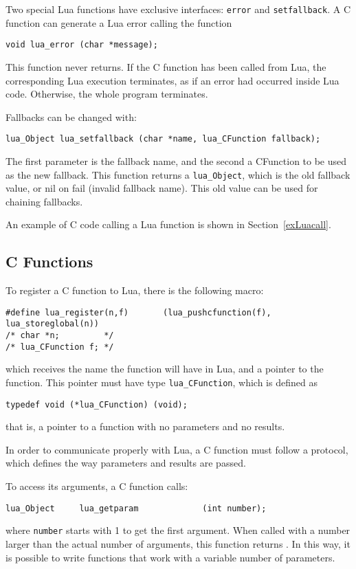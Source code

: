 Two special Lua functions have exclusive interfaces:
\verb'error' and \verb'setfallback'.
A C function can generate a Lua error calling the function
\begin{verbatim}
void lua_error (char *message);
\end{verbatim}
This function never returns.
If the C function has been called from Lua,
the corresponding Lua execution terminates,
as if an error had occurred inside Lua code.
Otherwise, the whole program terminates.

Fallbacks can be changed with:
\begin{verbatim}
lua_Object lua_setfallback (char *name, lua_CFunction fallback);
\end{verbatim}
The first parameter is the fallback name,
and the second a CFunction to be used as the new fallback.
This function returns a \verb'lua_Object',
which is the old fallback value,
or nil on fail (invalid fallback name).
This old value can be used for chaining fallbacks.

An example of C code calling a Lua function is shown in
Section~\ref{exLuacall}.


\subsection{C Functions} \label{LuacallC}
To register a C function to Lua,
there is the following macro:
\begin{verbatim}
#define lua_register(n,f)       (lua_pushcfunction(f), lua_storeglobal(n))
/* char *n;         */
/* lua_CFunction f; */
\end{verbatim}
which receives the name the function will have in Lua,
and a pointer to the function.
This pointer must have type \verb'lua_CFunction',
which is defined as
\begin{verbatim}
typedef void (*lua_CFunction) (void);
\end{verbatim}
that is, a pointer to a function with no parameters and no results.

In order to communicate properly with Lua,
a C function must follow a protocol,
which defines the way parameters and results are passed.

To access its arguments, a C function calls:
\begin{verbatim}
lua_Object     lua_getparam             (int number);
\end{verbatim}
where \verb'number' starts with 1 to get the first argument.
When called with a number larger than the actual number of arguments,
this function returns .
In this way, it is possible to write functions that work with
a variable number of parameters.

